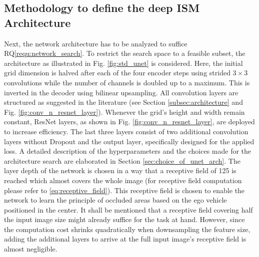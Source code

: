 \subsection{Methodology to define the deep ISM Architecture}
\label{subsec:method_deep_ism_architecture}
Next, the network architecture has to be analyzed to suffice RQ\ref{requ:network_search}. To restrict the search space to a feasible subset, the architecture as illustrated in Fig. \ref{fig:std_unet} is considered. Here, the initial grid dimension is halved after each of the four encoder steps using strided $3\times 3$ convolutions while the number of channels is doubled up to a maximum. This is inverted in the decoder using bilinear upsampling. All convolution layers are structured as suggested in the literature (see Section \ref{subsec:architecture} and Fig. \ref{fig:conv_n_resnet_layer}). Whenever the grid's height and width remain constant, ResNet layers, as shown in Fig. \ref{fig:conv_n_resnet_layer}, are deployed to increase efficiency. The last three layers consist of two additional convolution layers without Dropout and the output layer, specifically designed for the applied loss. A detailed description of the hyperparameters and the choices made for the architecture search are elaborated in Section \ref{sec:choice_of_unet_arch}. The layer depth of the network is chosen in a way that a receptive field of 125 is reached which almost covers the whole image (for receptive field computation please refer to \eqref{eq:receptive_field}). This receptive field is chosen to enable the network to learn the principle of occluded areas based on the ego vehicle positioned in the center. It shall be mentioned that a receptive field covering half the input image size might already suffice for the task at hand. However, since the computation cost shrinks quadratically when downsampling the feature size, adding the additional layers to arrive at the full input image's receptive field is almost negligible. 
